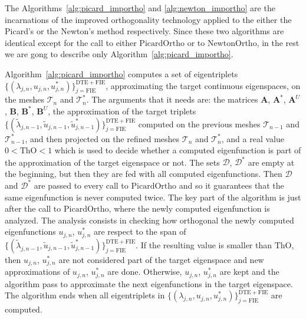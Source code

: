 \documentclass[smallextended]{svjour3}
\newcommand{\cT}{\mathcal{T}}
\begin{document}
The Algorithms~\ref{alg:picard_importho} and \ref{alg:newton_importho} are the incarnations of the improved orthogonality technology applied to the either the Picard's or the Newton's method respectively. Since these two algorithms are identical except for the call to either $\mathrm{PicardOrtho}$ or to $\mathrm{NewtonOrtho}$, in the rest we are gong to describe only Algorithm~\ref{alg:picard_importho}.

Algorithm~\ref{alg:picard_importho} computes a set of eigentriplets $\{(\lambda_{j,n},u_{j,n},u_{j,n}^*)\}_{j=\mathrm{FIE}}^{\mathrm{DTE}+\mathrm{FIE}}$, approximating the target continuous eigenspaces, on the meshes $\cT_n$ and $\cT_n^*$. The arguments that it needs are: the matrices $\mathbf{A}$, $\mathbf{A}^*$, $\mathbf{A}^U$, $\mathbf{B}$, $\mathbf{B}^*$, $\mathbf{B}^U$, the approximation of the target triplets $\{(\tilde\lambda_{j,n-1},\tilde u_{j,n-1},\tilde u_{j,n-1}^*)\}_{j=\mathrm{FIE}}^{\mathrm{DTE}+\mathrm{FIE}}$ computed on the previous meshes $\cT_{n-1}$ and $\cT_{n-1}^*$, and then projected on the refined meshes $\cT_n$ and $\cT_n^*$, and a real value $0<\mathrm{ThO}<1$ which is used to decide whether a computed eigenfunction is part of the approximation of the target eigenspace or not. The sets $\mathcal{D}$, $\mathcal{D}^*$ are empty at the beginning, but then they are fed with all computed eigenfunctions. Then $\mathcal{D}$ and $\mathcal{D}^*$ are passed to every call to $\mathrm{PicardOrtho}$ and so it guarantees that the same eigenfunction is never computed twice.
The key part of the algorithm is just after the call to $\mathrm{PicardOrtho}$, where the newly computed eigenfunction is analyzed. The analysis consists in checking how orthogonal the newly computed eigenfunctions $u_{j,n}$, $u_{j,n}^*$ are respect to the span of $\{(\tilde\lambda_{j,n-1},\tilde u_{j,n-1},\tilde u_{j,n-1}^*)\}_{j=\mathrm{FIE}}^{\mathrm{DTE}+\mathrm{FIE}}$. If the resulting value is smaller than $\mathrm{ThO}$, then $u_{j,n}$, $u_{j,n}^*$ are not considered part of the target eigenspace and new approximations of  $u_{j,n}$, $u_{j,n}^*$ are done. Otherwise, $u_{j,n}$, $u_{j,n}^*$ are kept and the algorithm pass to approximate the next eigenfunctions in the target eigenspace.
The algorithm ends when all eigentriplets in $\{(\lambda_{j,n},u_{j,n},u_{j,n}^*)\}_{j=\mathrm{FIE}}^{\mathrm{DTE}+\mathrm{FIE}}$ are computed.
\end{document}
